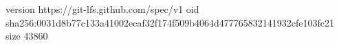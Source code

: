 version https://git-lfs.github.com/spec/v1
oid sha256:0031d8b77c133a41002ecaf32f174f509b4064d477765832141932cfe103fc21
size 43860
